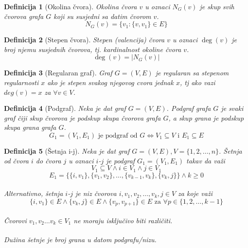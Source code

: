 \documentclass[11pt]{article}
\newtheorem{definition}{Definicija}
\begin{document}
		\begin{definition}[Okolina čvora]
		Okolina čvora $v$ u oznaci $N_G(v)$ je skup svih čvorova grafa $G$ koji su susjedni sa datim čvorom $v$.
		\[N_G(v) = \{ v_1 : \{v, v_1\} \in E\}\]
		\end{definition}
	
		\begin{definition}[Stepen čvora]
		Stepen (valencija) čvora $v$ u oznaci $\deg(v)$ je broj njemu susjednih čvorova, tj. kardinalnost okoline čvora $v$.
		\[\deg(v) = |N_G(v)|\]
		\end{definition}
		
		\begin{definition}[Regularan graf]
		Graf $G=(V,E)$ je regularan sa stepenom regularnosti $x$ ako je stepen svakog njegovog cvora jednak $x$, tj ako vazi $deg(v) = x$ za $\forall v \in V$. 
		\end{definition}
	
		\begin{definition}[Podgraf]
		Neka je dat graf $G = (V, E)$. Podgraf grafa $G$ je svaki graf čiji skup čvorova je podskup skupa čvorova grafa $G$, a skup grana je podskup skupa grana grafa $G$.
		\[ G_1 = (V_1, E_1) \text{ je podgraf od } G \Leftrightarrow V_1 \subseteq V \text{ i } E_1 \subseteq E \]
		\end{definition}
	
		\begin{definition}[Šetnja i-j]
		Neka je dat graf $G = (V, E), V = \{1, 2, \dots, n\}$. Šetnja od čvora $i$ do čvora $j$ u oznaci $i$-$j$ je podgraf $G_1 = (V_1, E_1)$ takav da važi 
		\[
		 	V_1 \subseteq V \land  i \in V_1 \land j \in V_1
		\]
		\[ 
		 	E_1 = \{\{i,v_1\},\{v_1,v_2\},\dots,\{v_{k-1},v_k\},\{v_k,j\}\} \land k \geq 0
		\] 
			\paragraph{}
			Alternativno, šetnja $i$-$j$ je niz čvorova $i, v_1, v_2, \dots, v_k, j \in V$ za koje važi 
			\[
				\{i,v_1\} \in E \land \{v_k,j\} \in E \land \{v_p,v_{p+1}\} \in E \text{ za } \forall p \in \{1,2, \dots, k-1\} 
			\]
			\paragraph{}
			Čvorovi $v_1,v_2 \dots v_k \in V_1 $ ne moraju isključivo biti različiti.
			\paragraph{}
			Dužina šetnje je broj grana u datom podgrafu/nizu.
		\end{definition}
	
\end{document}

